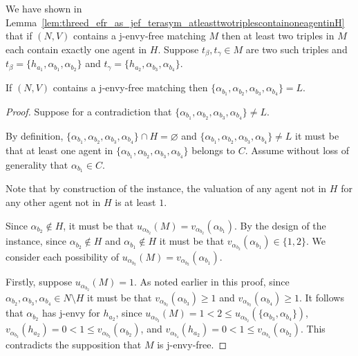 We have shown in Lemma~\ref{lem:threed_efr_as_jef_terasym_atleasttwotriplescontainoneagentinH} that if $(N, V)$ contains a j-envy-free matching $M$ then at least two triples in $M$ each contain exactly one agent in $H$. Suppose $t_{\beta}, t_{\gamma} \in M$ are two such triples and $t_{\beta} = \{ h_{a_1}, \alpha_{b_1}, \alpha_{b_2} \}$ and $t_{\gamma} = \{ h_{a_2}, \alpha_{b_3}, \alpha_{b_4} \}$.

\begin{lem}
\label{lem:threed_efr_as_jef_terasym_lequalsthefourisolated}
If $(N, V)$ contains a j-envy-free matching then $\{ \alpha_{b_1}, \alpha_{b_2}, \alpha_{b_3}, \alpha_{b_4} \} = L$.
\end{lem}
\begin{proof}
Suppose for a contradiction that $\{ \alpha_{b_1}, \alpha_{b_2}, \alpha_{b_3}, \alpha_{b_4} \} \neq L$.

By definition, $\{ \alpha_{b_1}, \alpha_{b_2}, \alpha_{b_3}, \alpha_{b_4} \} \cap H = \varnothing$ and $\{ \alpha_{b_1}, \alpha_{b_2}, \alpha_{b_3}, \alpha_{b_4} \} \neq L$ it must be that at least one agent in $\{ \alpha_{b_1}, \alpha_{b_2}, \alpha_{b_3}, \alpha_{b_4} \}$ belongs to $C$. Assume without loss of generality that $\alpha_{b_1} \in C$.

Note that by construction of the instance, the valuation of any agent not in $H$ for any other agent not in $H$ is at least $1$. 

Since $\alpha_{b_2} \notin H$, it must be that $u_{\alpha_{b_2}}(M) = v_{\alpha_{b_2}}(\alpha_{b_1})$. By the design of the instance, since $\alpha_{b_2} \notin H$ and $\alpha_{b_1} \notin H$ it must be that $v_{\alpha_{b_2}}(\alpha_{b_1}) \in \{ 1, 2 \}$. We consider each possibility of $u_{\alpha_{b_2}}(M) = v_{\alpha_{b_2}}(\alpha_{b_1})$.

Firstly, suppose $u_{\alpha_{b_2}}(M) = 1$. As noted earlier in this proof, since $\alpha_{b_2}, \alpha_{b_3}, \alpha_{b_4} \in N \setminus H$ it must be that $v_{\alpha_{b_2}}(\alpha_{b_3}) \geq 1$ and $v_{\alpha_{b_2}}(\alpha_{b_4}) \geq 1$. It follows that $\alpha_{b_2}$ has j-envy for $h_{a_2}$, since $u_{\alpha_{b_2}}(M) = 1 < 2 \leq u_{\alpha_{b_2}}(\{ \alpha_{b_3}, \alpha_{b_4} \})$, $v_{\alpha_{b_3}}(h_{a_2}) = 0 < 1 \leq v_{\alpha_{b_3}}(\alpha_{b_2})$, and $v_{\alpha_{b_4}}(h_{a_2}) = 0 < 1 \leq v_{\alpha_{b_4}}(\alpha_{b_2})$. This contradicts the supposition that $M$ is j-envy-free.


\end{proof}
